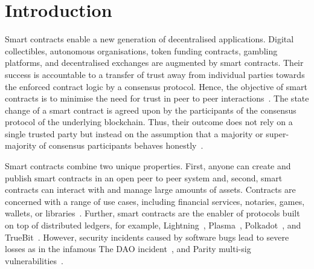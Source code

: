 \section{Introduction}
Smart contracts enable a new generation of decentralised applications.
Digital collectibles, autonomous organisations, token funding contracts, gambling platforms, and decentralised exchanges are augmented by smart contracts.
Their success is accountable to a transfer of trust away from individual parties towards the enforced contract logic by a consensus protocol.
Hence, the objective of smart contracts is to minimise the need for trust in peer to peer interactions~\cite{Szabo1997}.
The state change of a smart contract is agreed upon by the participants of the consensus protocol of the underlying blockchain.
Thus, their outcome does not rely on a single trusted party but instead on the assumption that a majority or super-majority of consensus participants behaves honestly~\cite{Nakamoto2008,Eyal2014}.

Smart contracts combine two unique properties. 
First, anyone can create and publish smart contracts in an open peer to peer system and, second, smart contracts can interact with and manage large amounts of assets.
Contracts are concerned with a range of use cases, including financial services, notaries, games, wallets, or libraries~\cite{Bartoletti2017}.
Further, smart contracts are the enabler of protocols built on top of distributed ledgers, for example, Lightning~\cite{Poon2016}, Plasma~\cite{Poon2017}, Polkadot~\cite{Wood2017}, and TrueBit~\cite{Teutsch2017}.
However, security incidents caused by software bugs lead to severe losses as in the infamous The DAO incident~\cite{Daian2016}, and Parity multi-sig vulnerabilities~\cite{Breidenbach2017Parity,ParityTech2017}. 

